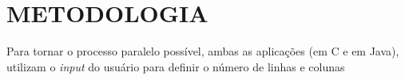 \section{\normalsize METODOLOGIA}
	Para tornar o processo paralelo possível, ambas as aplicações (em C e em Java), utilizam o \textit{input} do usuário para definir o número de linhas e colunas 
